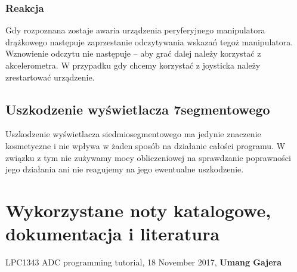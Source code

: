 \documentclass[a4paper,12pt,twoside]{article}
\theoremstyle{plain}
\theoremstyle{definition}
\theoremstyle{remark}
\begin{document}
	\subsubsection{Reakcja}
	Gdy rozpoznana zostaje awaria urządzenia peryferyjnego manipulatora drążkowego następuje zaprzestanie odczytywania wskazań tegoż manipulatora. Wznowienie odczytu nie następuje -- aby grać dalej należy korzystać z akcelerometra. W przypadku gdy chcemy korzystać z joysticka należy zrestartować urządzenie.
	
	\subsection{Uszkodzenie wyświetlacza 7segmentowego}
	Uszkodzenie wyświetlacza siedmiosegmentowego ma jedynie znaczenie kosmetyczne i nie wpływa w żaden sposób na działanie całości programu. W związku z tym nie zużywamy mocy obliczeniowej na sprawdzanie poprawności jego działania ani nie reagujemy na jego ewentualne uszkodzenie.
\section{Wykorzystane noty katalogowe, dokumentacja i literatura}
		
		
\begin{thebibliography}{abcd}
{LPC1343 ADC programming tutorial},
	{18 November 2017},
	\textbf{Umang Gajera}
\end{thebibliography}
\end{document}
